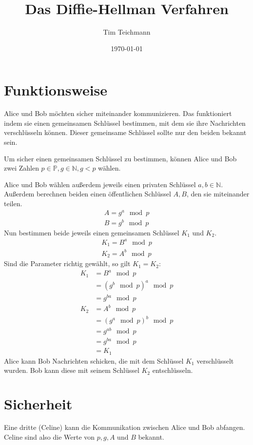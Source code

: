 \documentclass[twocolumn]{report}
\title{\textbf{Das Diffie-Hellman Verfahren}}
\author{Tim Teichmann}
\date{\today}
\begin{document}
\maketitle

\chapter{Funktionsweise}
Alice und Bob möchten sicher miteinander kommunizieren.
Das funktioniert indem sie einen gemeinsamen Schlüssel bestimmen,
mit dem sie ihre Nachrichten verschlüsseln können. Dieser gemeinsame
Schlüssel sollte nur den beiden bekannt sein.

Um sicher einen gemeinsamen Schlüssel zu bestimmen, können Alice und Bob
zwei Zahlen $p\in\mathbb{P},g\in\mathbb{N},g<p$ wählen.

Alice und Bob wählen außerdem jeweils einen privaten Schlüssel $a,b\in\mathbb{N}$.
Außerdem berechnen beiden einen öffentlichen Schlüssel $A,B$, den sie miteinander teilen.
\begin{align}
    A=g^a \mod p \\
    B=g^b \mod p
\end{align}
Nun bestimmen beide jeweils einen gemeinsamen Schlüssel $K_1$ und $K_2$.
\begin{align}
    K_1=B^a \mod p \\
    K_2=A^b \mod p
\end{align}
Sind die Parameter richtig gewählt, so gilt $K_1=K_2$:
\begin{align}
    K_1&=B^a \mod p \\
    &=\left(g^b \mod p\right)^a \mod p \\
    &=g^{ba} \mod p \\
    K_2&=A^b \mod p \\
    &=\left(g^a \mod p\right)^b \mod p \\
    &=g^{ab} \mod p \\
    &=g^{ba} \mod p \\
    &=K_1
\end{align}
Alice kann Bob Nachrichten schicken, die mit dem Schlüssel $K_1$ verschlüsselt wurden.
Bob kann diese mit seinem Schlüssel $K_2$ entschlüsseln.

\chapter{Sicherheit}
Eine dritte (Celine) kann die Kommunikation zwischen Alice und Bob abfangen.
Celine sind also die Werte von $p,g,A$ und $B$ bekannt.
\end{document}
